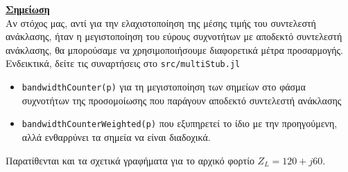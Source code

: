 \documentclass[12pt]{article}
\begin{document}
\underline{\textbf{Σημείωση}} \\
Αν στόχος μας, αντί για την ελαχιστοποίηση της μέσης τιμής του συντελεστή ανάκλασης, ήταν η μεγιστοποίηση του εύρους συχνοτήτων με αποδεκτό συντελεστή ανάκλασης, θα μπορούσαμε να χρησιμοποιήσουμε διαφορετικά μέτρα προσαρμογής. Ενδεικτικά, δείτε τις συναρτήσεις στο \texttt{src/multiStub.jl} 
\begin{itemize}
    \item \texttt{bandwidthCounter(p)} για τη μεγιστοποίηση των σημείων στο φάσμα συχνοτήτων της προσομοίωσης που παράγουν αποδεκτό συντελεστή ανάκλασης
    \item \texttt{bandwidthCounterWeighted(p)} που εξυπηρετεί το ίδιο με την προηγούμενη, αλλά ενθαρρύνει τα σημεία να είναι διαδοχικά. 
\end{itemize} 
Παρατίθενται και τα σχετικά γραφήματα για το αρχικό φορτίο \(Z_L = 120 + j60\). 

\begin{figure}[H]
    \centering
    \qquad
\end{figure}
\end{document}
